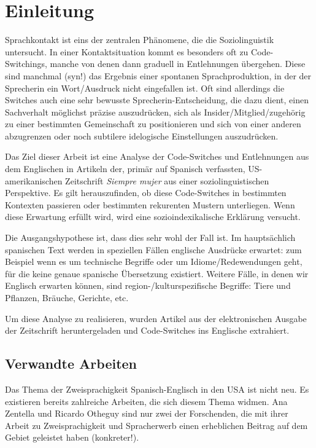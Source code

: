 \section{Einleitung}


Sprachkontakt ist eins der zentralen Phänomene, die die Soziolinguistik untersucht.
In einer Kontaktsituation kommt es besonders oft zu Code-Switchings, manche von denen dann graduell in Entlehnungen übergehen.
Diese sind manchmal (syn!) das Ergebnis einer spontanen Sprachproduktion, in der der Sprecherin ein Wort/Ausdruck nicht eingefallen ist.
Oft sind allerdings die Switches auch eine sehr bewusste Sprecherin-Entscheidung, die dazu dient, einen Sachverhalt möglichst präzise auszudrücken, sich als Insider/Mitglied/zugehörig zu einer bestimmten Gemeinschaft zu positionieren und sich von einer anderen abzugrenzen oder noch subtilere idelogische Einstellungen auszudrücken.


Das Ziel dieser Arbeit ist eine Analyse der Code-Switches und Entlehnungen aus dem Englischen in Artikeln der, primär auf Spanisch verfassten, US-amerikanischen Zeitschrift \textit{Siempre mujer} aus einer soziolinguistischen Perspektive.
Es gilt herauszufinden, ob diese Code-Switches in bestimmten Kontexten passieren oder bestimmten rekurenten Mustern unterliegen.
Wenn diese Erwartung erfüllt wird, wird eine sozioindexikalische Erklärung versucht.

Die Ausgangshypothese ist, dass dies sehr wohl der Fall ist.
Im hauptsächlich spanischen Text werden in speziellen Fällen englische Ausdrücke erwartet:
zum Beispiel wenn es um technische Begriffe oder um Idiome/Redewendungen geht, für die keine genaue spanische Übersetzung existiert.
Weitere Fälle, in denen wir Englisch erwarten können, sind region-/kulturspezifische Begriffe: Tiere und Pflanzen, Bräuche, Gerichte, etc.

Um diese Analyse zu realisieren, wurden Artikel aus der elektronischen Ausgabe der Zeitschrift heruntergeladen und Code-Switches ins Englische extrahiert.

\subsection{Verwandte Arbeiten}

Das Thema der Zweisprachigkeit Spanisch-Englisch in den USA ist nicht neu.
Es existieren bereits zahlreiche Arbeiten, die sich diesem Thema widmen.
Ana Zentella und Ricardo Otheguy sind nur zwei der Forschenden, die mit ihrer Arbeit zu Zweisprachigkeit und Spracherwerb einen erheblichen Beitrag auf dem Gebiet geleistet haben (konkreter!). %

